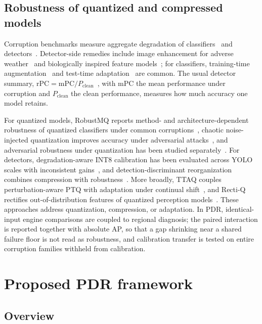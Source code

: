 \documentclass[a4paper,fleqn]{cas-dc}
\begin{document}
\subsection{Robustness of quantized and compressed models}

Corruption benchmarks measure aggregate degradation of classifiers~\citep{hendrycks2019corruptions} and detectors~\citep{michaelis2019detectorrobustness,liu2024realworldcorruptions}. Detector-side remedies include image enhancement for adverse weather~\citep{yin2025spatialie} and biologically inspired feature models~\citep{wang2025hubelwiesel}; for classifiers, training-time augmentation~\citep{hendrycks2020augmix} and test-time adaptation~\citep{wang2021tent,niu2022eata,luo2026dpctta} are common. The usual detector summary, $\mathrm{rPC}=\mathrm{mPC}/P_{\mathrm{clean}}$~\citep{michaelis2019detectorrobustness}, with mPC the mean performance under corruption and $P_{\mathrm{clean}}$ the clean performance, measures how much accuracy one model retains.

For quantized models, RobustMQ reports method- and architecture-dependent robustness of quantized classifiers under common corruptions~\citep{xiao2023robustmq}, chaotic noise-injected quantization improves accuracy under adversarial attacks~\citep{osama2024chaotic}, and adversarial robustness under quantization has been studied separately~\citep{li2024quantrobustness}. For detectors, degradation-aware INT8 calibration has been evaluated across YOLO scales with inconsistent gains~\citep{karimov2025robustness}, and detection-discriminant reorganization combines compression with robustness~\citep{choi2026detectorrobustness}. More broadly, TTAQ couples perturbation-aware PTQ with adaptation under continual shift~\citep{xiao2024ttaq}, and Recti-Q rectifies out-of-distribution features of quantized perception models~\citep{araghi2026rectiq}. These approaches address quantization, compression, or adaptation. In PDR, identical-input engine comparisons are coupled to regional diagnosis; the paired interaction is reported together with absolute AP, so that a gap shrinking near a shared failure floor is not read as robustness, and calibration transfer is tested on entire corruption families withheld from calibration.

\section{Proposed PDR framework}
\label{sec:framework}

\subsection{Overview}
\end{document}
